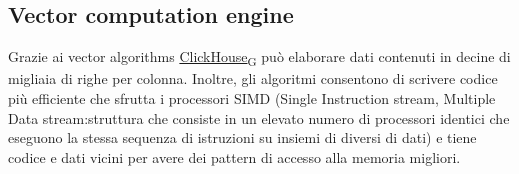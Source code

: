 \subsection{Vector computation engine}
Grazie ai vector algorithms \href{https://7last.github.io/docs/pb/documentazione-interna/glossario\#clickhouse}{ClickHouse\textsubscript{G}} può elaborare dati contenuti in decine di migliaia di righe per colonna. Inoltre, gli algoritmi consentono di scrivere codice più efficiente che sfrutta i processori SIMD (Single Instruction stream, Multiple Data stream:struttura che consiste in un elevato numero di processori identici che eseguono la stessa sequenza di istruzioni su insiemi di diversi di dati) e tiene codice e dati vicini per avere dei pattern di accesso alla memoria migliori.















